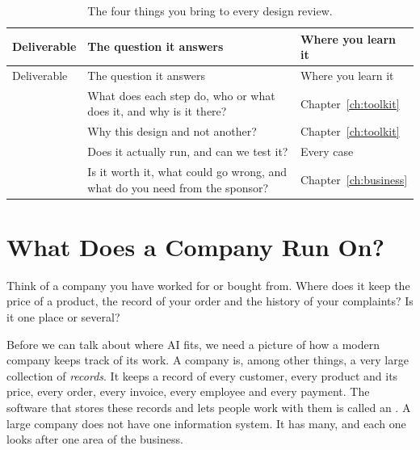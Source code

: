 \begingroup
\small
\begin{xltabular}{\textwidth}{@{}>{\raggedright\arraybackslash}p{3.3cm}>{\raggedright\arraybackslash}X>{\raggedright\arraybackslash}p{2.6cm}@{}}
\caption{The four things you bring to every design review.}\label{tab:deliverables}\\
\toprule
{} Deliverable & The question it answers & Where you learn it \\
\midrule
\endfirsthead
\toprule
{} Deliverable & The question it answers & Where you learn it \\
\midrule
\endhead
{} & What does each step do, who or what does it, and why is it there? & Chapter~\ref{ch:toolkit} \\
 & Why this design and not another? & Chapter~\ref{ch:toolkit} \\
 & Does it actually run, and can we test it? & Every case \\
 & Is it worth it, what could go wrong, and what do you need from the sponsor? & Chapter~\ref{ch:business} \\
\bottomrule
\end{xltabular}
\endgroup

\section{What Does a Company Run On?}
\label{sec:company-systems}

\begin{thinkabout}
Think of a company you have worked for or bought from. Where does it keep the price of a product, the record of your order and the history of your complaints? Is it one place or several?
\end{thinkabout}

Before we can talk about where AI fits, we need a picture of how a modern company keeps track of its work. A company is, among other things, a very large collection of \emph{records}. It keeps a record of every customer, every product and its price, every order, every invoice, every employee and every payment. The software that stores these records and lets people work with them is called an . A large company does not have one information system. It has many, and each one looks after one area of the business.

